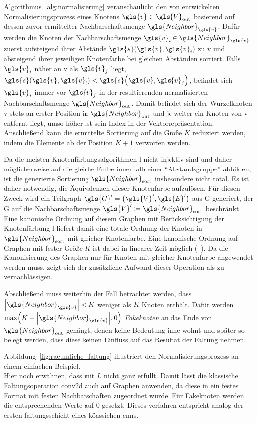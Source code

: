 Algorithmus~\ref{alg:normalisierung} veranschaulicht den von \citeauthor{patchy} entwickelten Normalisierungsprozess \bzgl{} eines Knotens $\gls{v} \in \gls{V}_{\mathrm{out}}$ basierend auf dessen zuvor ermittelter Nachbarschaftsmenge $\gls{Neighbor}_{\gls{v}}$.
Dafür werden die Knoten der Nachbarschaftsmenge $\gls{v}_i \in \gls{Neighbor}_{\gls{v}}$ zuerst aufsteigend \bzgl{} ihrer Abstände $\gls{s}\left(\gls{v}, \gls{v}_i\right)$ zu \gls{v} und absteigend \bzgl{} ihrer jeweiligen Knotenfarbe bei gleichen Abständen sortiert.
Falls $\gls{v}_i$ näher an \gls{v} als $\gls{v}_j$ liegt, \dhe{} $\gls{s}\left(\gls{v}, \gls{v}_i\right) < \gls{s}\left(\gls{v}, \gls{v}_j\right)$, befindet sich $\gls{v}_i$ immer vor $\gls{v}_j$ in der resultierenden normalisierten Nachbarschaftsmenge $\gls{Neighbor}_{\mathrm{out}}$.
Damit befindet sich der Wurzelknoten \gls{v} stets an erster Position in $\gls{Neighbor}_{\mathrm{out}}$ und je weiter ein Knoten von \gls{v} entfernt liegt, umso höher ist sein Index in der Vektorrepräsentation.
Anschließend kann die ermittelte Sortierung auf die Größe $K$ reduziert werden, indem die Elemente ab der Position $K+1$ verworfen werden.

Da die meisten Knotenfärbungsalgorithmen \gls{l} nicht injektiv sind und daher möglicherweise auf die gleiche Farbe innerhalb einer \enquote{Abstandsgruppe} abbilden, ist die generierte Sortierung $\gls{Neighbor}_{\mathrm{sort}}$ insbesondere nicht total.
Es ist daher notwendig, die Äquivalenzen dieser Knotenfarbe aufzulösen.
Für diesen Zweck wird ein Teilgraph $\gls{G}^{\prime} = \left(\gls{V}^{\prime}, \gls{E}^{\prime}\right)$ aus \gls{G} generiert, der \gls{G} auf die Nachbarschaftsmenge $\gls{V}^{\prime} \coloneqq \gls{Neighbor}_{\mathrm{sort}}$ beschränkt.
Eine kanonische Ordnung auf diesem Graphen mit Berücksichtigung der Knotenfärbung \gls{l} liefert damit eine totale Ordnung der Knoten in $\gls{Neighbor}_{\mathrm{sort}}$ mit gleicher Knotenfarbe.
Eine kanonische Ordnung auf Graphen mit fester Größe $K$ ist dabei in linearer Zeit möglich (\vgl{}~\cite{patchy}).
Da die Kanonisierung des Graphen nur für Knoten mit gleicher Knotenfarbe angewendet werden muss, zeigt sich der zusätzliche Aufwand dieser Operation als zu vernachlässigen.

Abschließend muss weiterhin der Fall betrachtet werden, dass $\left|\gls{Neighbor}_{\gls{v}}\right| < K$ weniger als $K$ Knoten enthält.
Dafür werden $\max\left(K - \left|\gls{Neighbor}_{\gls{v}}\right|, 0\right)$ \emph{Fakeknoten} an das Ende von $\gls{Neighbor}_{\mathrm{out}}$ gehängt, denen keine Bedeutung inne wohnt und später so belegt werden, dass diese keinen Einfluss auf das Resultat der Faltung nehmen.

Abbildung~\ref{fig:raeumliche_faltung} illustriert den Normalisierungsprozess an einem einfachen Beispiel.
\\
Hier noch erwähnen, dass mit $L$ nicht ganz erfüllt.
Damit lässt die klassische Faltungsoperation \gls{conv2d} auch auf Graphen anwenden, da diese in ein festes Format mit festen Nachbarschaften zugeordnet wurde.
Für Fakeknoten werden die entsprechenden Werte auf $0$ gesetzt.
Dieses verfahren entspricht analog der ersten faltungsschicht eines köassichen cnns.
